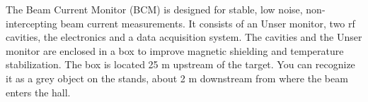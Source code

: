 

The Beam Current Monitor (BCM) is designed for stable, low noise, non-intercepting 
beam current measurements. It consists of an Unser monitor, two rf cavities, 
the electronics and a data acquisition system. The cavities and the Unser monitor 
are enclosed in a box to improve magnetic shielding and temperature stabilization.
The box is located 25 m upstream of the target. You can recognize it as a grey 
object on the stands, about 2 m downstream from where the beam enters the 
hall. 

